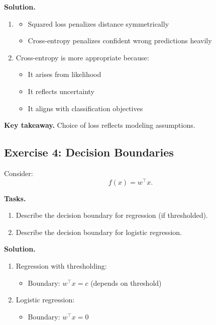 \medskip

\noindent
\textbf{Solution.}

\begin{enumerate}
\item 
\begin{itemize}
    \item Squared loss penalizes distance symmetrically
    \item Cross-entropy penalizes confident wrong predictions heavily
\end{itemize}

\item Cross-entropy is more appropriate because:
\begin{itemize}
    \item It arises from likelihood
    \item It reflects uncertainty
    \item It aligns with classification objectives
\end{itemize}
\end{enumerate}

\medskip

\noindent
\textbf{Key takeaway.}  
Choice of loss reflects modeling assumptions.

\subsection{Exercise 4: Decision Boundaries}

Consider:
\[
f(x) = w^\top x.
\]

\medskip

\noindent
\textbf{Tasks.}
\begin{enumerate}
    \item Describe the decision boundary for regression (if thresholded).
    \item Describe the decision boundary for logistic regression.
\end{enumerate}

\medskip

\noindent
\textbf{Solution.}

\begin{enumerate}
\item Regression with thresholding:
\begin{itemize}
    \item Boundary: $w^\top x = c$ (depends on threshold)
\end{itemize}

\item Logistic regression:
\begin{itemize}
    \item Boundary: $w^\top x = 0$
\end{itemize}
\end{enumerate}

